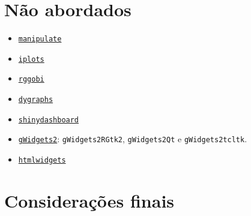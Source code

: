\section{Não abordados}

\begin{frame}

  \begin{itemize}
  \item 
    \href{https://cran.r-project.org/web/packages/manipulate/index.html}{\texttt{manipulate}}
  \item
    \href{http://cran.r-project.org/web/packages/iplots/index.html}{\texttt{iplots}}
  \item
    \href{http://cran.r-project.org/web/packages/rggobi/index.html}{\texttt{rggobi}}
  \item
    \href{https://rstudio.github.io/dygraphs/index.html}{\texttt{dygraphs}}
  \item
    \href{http://rstudio.github.io/shinydashboard/index.html}{\texttt{shinydashboard}}
  \item
    \href{https://cran.r-project.org/web/packages/gWidgets2/index.html}{\texttt{gWidgets2}}:
    \texttt{gWidgets2RGtk2}, \texttt{gWidgets2Qt} e \texttt{gWidgets2tcltk}.
  \item
    \href{http://www.htmlwidgets.org/index.html}{\texttt{htmlwidgets}}
  \end{itemize}

\end{frame}

\section{Considerações finais}

